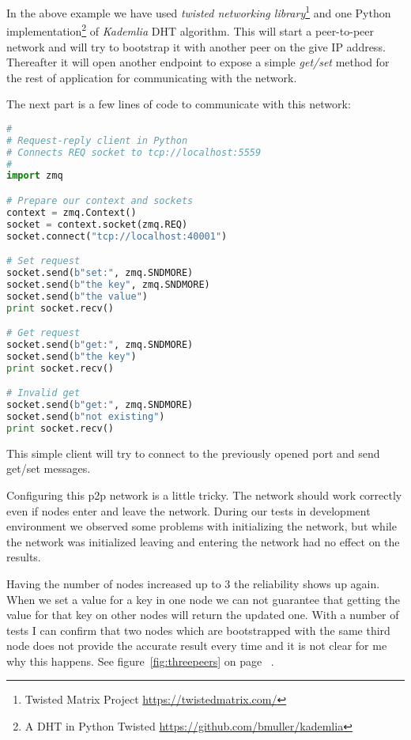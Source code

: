 In the above example we have used 
\textit{twisted networking library}\footnote{Twisted Matrix Project \url{https://twistedmatrix.com/}} and one
Python implementation\footnote{A DHT in Python 
Twisted \url{https://github.com/bmuller/kademlia}} of \textit{Kademlia} DHT algorithm\cite{KademliaPaper}. 
This will start a peer-to-peer network and will try to bootstrap it with another peer on the give IP address.
Thereafter it will open another endpoint to expose a simple \textit{get/set} method for the rest of
application for communicating with the network.

The next part is a few lines of code to communicate with this network:

\begin{lstlisting}[language=python, caption={Multipart messages with ZeroMQ REQ/REP pattern}]
#
# Request-reply client in Python
# Connects REQ socket to tcp://localhost:5559
#
import zmq

# Prepare our context and sockets
context = zmq.Context()
socket = context.socket(zmq.REQ)
socket.connect("tcp://localhost:40001")

# Set request
socket.send(b"set:", zmq.SNDMORE)
socket.send(b"the key", zmq.SNDMORE)
socket.send(b"the value")
print socket.recv()

# Get request
socket.send(b"get:", zmq.SNDMORE)
socket.send(b"the key")
print socket.recv()

# Invalid get
socket.send(b"get:", zmq.SNDMORE)
socket.send(b"not existing")
print socket.recv()
\end{lstlisting}

This simple client will try to connect to the previously opened port and send get/set messages.

Configuring this p2p network is a little tricky. The network should work correctly even if nodes enter
and leave the network. During our tests in development environment we observed some problems with initializing the network,
but while the network was initialized leaving and entering the network had no effect on the results.

Having the number of nodes increased up to 3 the reliability shows up again. When we set a value for a key 
in one node we can not guarantee that getting the value for that key on other nodes will return the updated one.
With a number of tests I can confirm that two nodes which are bootstrapped with the same third node does not
provide the accurate result every time and it is not clear for me why this happens. See figure~\ref{fig:threepeers} on page ~\pageref{fig:threepeers}.

